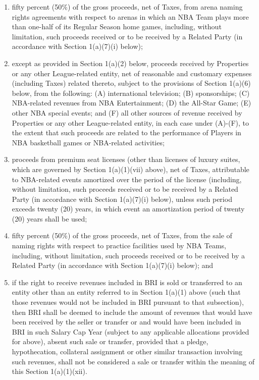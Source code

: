\documentclass[
]{book}
\begin{document}
\begin{enumerate}
\begin{enumerate}
\begin{enumerate}
    \item
      fifty percent (50\%) of the gross proceeds, net of Taxes, from arena naming rights agreements with respect to arenas in which an NBA Team plays more than one-half of its Regular Season home games, including, without limitation, such proceeds received or to be received by a Related Party (in accordance with Section 1(a)(7)(i) below);
    \item
      except as provided in Section 1(a)(2) below, proceeds received by Properties or any other League-related entity, net of reasonable and customary expenses (including Taxes) related thereto, subject to the provisions of Section 1(a)(6) below, from the following: (A) international television; (B) sponsorships; (C) NBA-related revenues from NBA Entertainment; (D) the All-Star Game; (E) other NBA special events; and (F) all other sources of revenue received by Properties or any other League-related entity, in each case under (A)-(F), to the extent that such proceeds are related to the performance of Players in NBA basketball games or NBA-related activities;
    \item
      proceeds from premium seat licenses (other than licenses of luxury suites, which are governed by Section 1(a)(1)(vii) above), net of Taxes, attributable to NBA-related events amortized over the period of the license (including, without limitation, such proceeds received or to be received by a Related Party (in accordance with Section 1(a)(7)(i) below), unless such period exceeds twenty (20) years, in which event an amortization period of twenty (20) years shall be used;
    \item
      fifty percent (50\%) of the gross proceeds, net of Taxes, from the sale of naming rights with respect to practice facilities used by NBA Teams, including, without limitation, such proceeds received or to be received by a Related Party (in accordance with Section 1(a)(7)(i) below); and
    \item
      if the right to receive revenues included in BRI is sold or transferred to an entity other than an entity referred to in Section 1(a)(1) above (such that those revenues would not be included in BRI pursuant to that subsection), then BRI shall be deemed to include the amount of revenues that would have been received by the seller or transfer or and would have been included in BRI in such Salary Cap Year (subject to any applicable allocations provided for above), absent such sale or transfer, provided that a pledge, hypothecation, collateral assignment or other similar transaction involving such revenues, shall not be considered a sale or transfer within the meaning of this Section 1(a)(1)(xii).

\end{enumerate}
\end{enumerate}
\end{enumerate}
\end{document}
